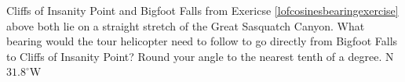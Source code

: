 { Cliffs of Insanity Point and Bigfoot Falls from Exericse \ref{lofcosinesbearingexercise} above both lie on a straight stretch of the Great Sasquatch Canyon.  What bearing would the tour helicopter need to follow to go directly from Bigfoot Falls to Cliffs of Insanity Point?  Round your angle to the nearest tenth of a degree.}
{ N$31.8^{\circ}$W}
